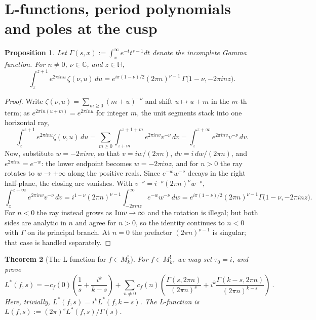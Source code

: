 \documentclass[11pt]{article}
\newtheorem{theorem}{Theorem}[section]
\newtheorem{proposition}[theorem]{Proposition}
\newcommand{\HH}{\mathbb{H}}
\newcommand{\CC}{\mathbb{C}}
\begin{document}
\section{L-functions, period polynomials and poles at the cusp}\label{sec:Lfun}

\begin{proposition}\label{prop:HGG}
Let $\Gamma(s, x) := \int_x^{\infty} e^{-t} t^{s-1} dt$ denote the {\em incomplete Gamma function}. For $n\ne0$, $\nu\in\CC$, and $z\in\HH$,
\begin{equation}
\int_{z}^{z+1}\! e^{2\pi inu}\,\zeta(\nu,u)\,du=e^{i \pi (1-\nu)/2} (2\pi n)^{\nu-1}\,\Gamma\big(1-\nu,-2\pi i n z\big).
\end{equation}
\end{proposition}

\begin{proof}
Write $\zeta(\nu,u)=\sum_{m\ge0}(m+u)^{-\nu}$ and shift $u\mapsto u+m$ in the $m$-th term; as
$e^{2\pi in(u+m)}=e^{2\pi inu}$ for integer $m$, the unit segments stack into one horizontal ray,
\begin{equation}
\int_z^{z+1}\! e^{2\pi inu}\zeta(\nu,u)\,du
=\sum_{m\ge0}\int_{z+m}^{z+1+m}\! e^{2\pi inv}v^{-\nu}\,dv
=\int_z^{z+\infty}\! e^{2\pi inv}v^{-\nu}\,dv.
\end{equation}
Now, substitute $w=-2\pi i n v$, so that $v=iw/(2\pi n)$, $dv=i\,dw/(2\pi n)$, and $e^{2\pi inv}=e^{-w}$:
the lower endpoint becomes $w=-2\pi i n z$, and for $n>0$ the ray rotates to $w\to+\infty$ along the
positive reals. Since $e^{-w}w^{-\nu}$ decays in the right half-plane, the closing arc
vanishes. With $v^{-\nu}=i^{-\nu}(2\pi n)^{\nu}w^{-\nu}$,
\begin{equation}
\int_z^{z+\infty}\! e^{2\pi inv}v^{-\nu}\,dv
=i^{1-\nu}(2\pi n)^{\nu-1}\!\int_{-2\pi i n z}^{\infty}\! e^{-w}w^{-\nu}\,dw
=e^{i \pi (1-\nu)/2}(2\pi n)^{\nu-1}\Gamma\big(1-\nu,-2\pi i n z\big).
\end{equation}
For $n<0$ the ray instead grows as ${\rm Im} v\to\infty$ and the rotation is illegal; but both sides are
analytic in $n$ and agree for $n>0$, so the identity continues to $n<0$ with $\Gamma$ on its principal
branch. At $n=0$ the prefactor $(2\pi n)^{\nu-1}$ is singular; that case is handled separately.
\end{proof}

\begin{theorem}[The L-function for $f \in M_k^!$]\label{thm:weakL}
For $f\in M^!_k$, we may set $\tau_0=i$, and prove
\begin{equation}\label{eq:weakL}
L^*(f,s)=-c_f(0)\left(\frac1s+\frac{i^k}{k-s}\right)
+\sum_{n\ne0}c_f(n)\left(\frac{\Gamma(s,2\pi n)}{(2\pi n)^s}+i^k\frac{\Gamma(k-s,2\pi n)}{(2\pi n)^{k-s}}\right)~.
\end{equation}
Here, trivially, $L^*(f,s) = i^k L^*(f,k-s)$. The L-function is $L(f,s) := (2\pi)^s L^*(f,s) /\Gamma(s)$.
\end{theorem}
\end{document}
